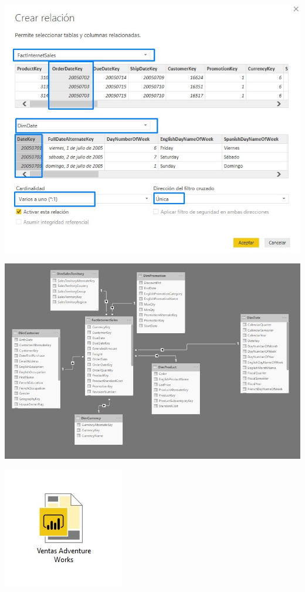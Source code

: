 \begin{center}
\includegraphics[width=\columnwidth]{images/task1/task1-03}\newline
\end{center}

\begin{center}
\includegraphics[width=\columnwidth]{images/task1/task1-04}\newline
\end{center}

\begin{center}
\includegraphics{images/task1/task1-05}\newline
\end{center}

